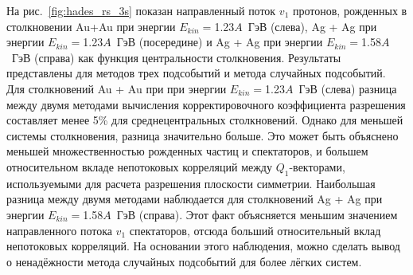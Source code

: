 На рис.~\ref{fig:hades_rs_3s} показан направленный поток $v_1$ протонов, рожденных в столкновении Au+Au при энергии $E_{kin}=$1.23$A$~ГэВ (слева), Ag + Ag при энергии $E_{kin}=$1.23$A$~ГэВ (посередине) и Ag + Ag при энергии $E_{kin}=$1.58$A$~ГэВ (справа) как функция центральности столкновения. Результаты представлены для методов трех подсобытий и метода случайных подсобытий.
Для столкновений Au + Au при при энергии $E_{kin}=$1.23$A$~ГэВ (слева) разница между двумя методами вычисления корректировочного коэффициента разрешения составляет менее 5\% для среднецентральных столкновений.
Однако для меньшей системы столкновения, разница значительно больше. 
Это может быть объяснено меньшей множественностью рожденных частиц и спектаторов, и большем относительном вкладе непотоковых корреляций между $Q_1$-векторами, используемыми для расчета разрешения плоскости симметрии.
Наибольшая разница между двумя методами наблюдается для столкновений Ag + Ag при энергии $E_{kin}=$1.58$A$~ГэВ (справа).
Этот факт объясняется меньшим значением направленного потока $v_1$ спектаторов, отсюда больший относительный вклад непотоковых корреляций.
На основании этого наблюдения, можно сделать вывод о ненадёжности метода случайных подсобытий для более лёгких систем.
%
